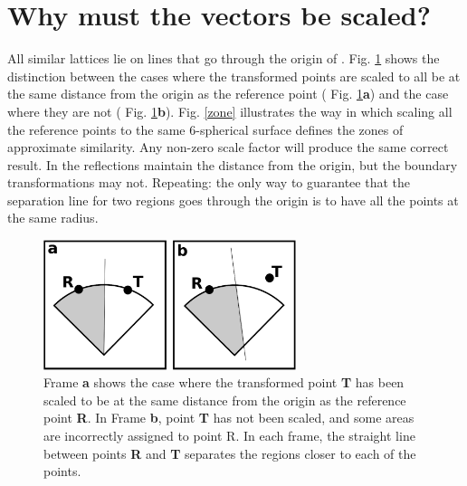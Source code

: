 \documentclass[preprint]{iucr}              %
\numberwithin{equation}{section}
\numberwithin{equation}{section}
\begin{document}
	\section{Why must the \SVI{} vectors be scaled?} 	\label{section:modified}
	
	All similar lattices lie on lines that go through the origin of \SVI{}. Fig. \ref{similarity} shows
	the distinction between the cases where the transformed points are scaled to all be at the same
	distance from the origin as the reference point ( Fig. \ref{similarity}\textbf{a}) and the case where they are not ( Fig. \ref{similarity}\textbf{b}).
	Fig. \ref{zone} illustrates the way in which scaling all the reference points to the same
	6-spherical surface defines the zones of approximate similarity.
	Any non-zero scale factor will produce the same correct result. In \SVI{}
	the reflections maintain the distance from the origin, but the boundary transformations may not.
	Repeating: the only way to guarantee that the
	separation line for two regions goes through the origin is to have all the points at
	the same radius.
	
	\begin{figure}
		\label{similarity}
		\includegraphics[height=3.8cm]{similarity}
		\caption{Frame \textbf{a} shows the case where the transformed point \textbf{T} has been scaled to be at the same distance 
			from the origin as the reference point \textbf{R}.  In Frame \textbf{b}, point \textbf{T} has not been scaled, and some areas
			are incorrectly assigned to point R.  In each frame, the straight line between points \textbf{R} and \textbf{T} separates the 
			regions closer to each of the points.}
	\end{figure}
	
\end{document}
